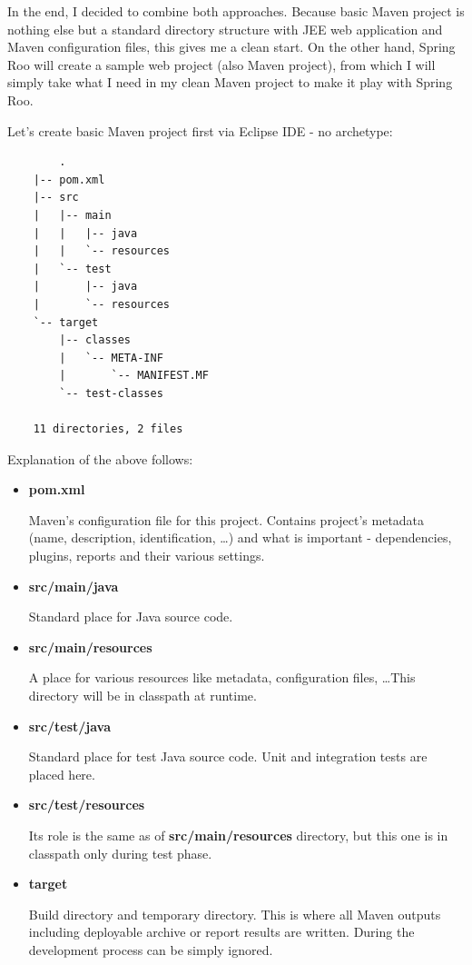 	In the end, I decided to combine both approaches. Because basic Maven project is nothing else but a standard directory
	structure with JEE web application and Maven configuration files, this gives me a clean start. On the other hand,
	Spring Roo will create a sample web project (also Maven project), from which I will simply take what I need in my clean
	Maven project to make it play with Spring Roo.
	
	Let's create basic Maven project first via Eclipse IDE - no archetype:
	
	\begin{verbatim}
		.
	|-- pom.xml
	|-- src
	|   |-- main
	|   |   |-- java
	|   |   `-- resources
	|   `-- test
	|       |-- java
	|       `-- resources
	`-- target
	    |-- classes
	    |   `-- META-INF
	    |       `-- MANIFEST.MF
	    `-- test-classes
	
	11 directories, 2 files
	\end{verbatim}
	
	Explanation of the above follows:
	
	\begin{itemize}
		\item \textbf{pom.xml} 
		
		Maven's configuration file for this project. Contains project's metadata (name, description, identification, \ldots)
		and what is important - dependencies, plugins, reports and their various settings.
		\item \textbf{src/main/java}
		
		Standard place for Java source code.
		\item \textbf{src/main/resources}
		
		A place for various resources like metadata, configuration files, \ldots This directory will be in classpath at
		runtime.
		\item \textbf{src/test/java}
		
		Standard place for test Java source code. Unit and integration tests are placed here.
		\item \textbf{src/test/resources}
		
		Its role is the same as of \textbf{src/main/resources} directory, but this one is in classpath only during test
		phase.
		\item \textbf{target}
		
		Build directory and temporary directory. This is where all Maven outputs including deployable archive or report
		results are written. During the development process can be simply ignored.
	\end{itemize}
	
